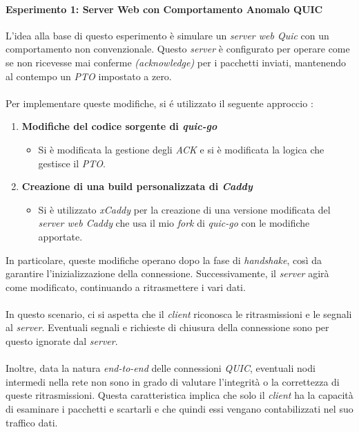 \paragraph{Esperimento 1: Server Web con Comportamento Anomalo QUIC}
\noindent L'idea alla base di questo esperimento è simulare un \emph{server web Quic} con un comportamento non convenzionale. 
Questo \emph{server} è configurato per operare come se non ricevesse mai conferme \emph{(acknowledge)} per i pacchetti inviati, mantenendo al contempo un \emph{PTO} impostato a zero.
\\\\
Per implementare queste modifiche, si é utilizzato il seguente approccio : 
\begin{enumerate}[label=\roman*]
    \item \textbf{Modifiche del codice sorgente di \emph{quic-go}}
    \begin{itemize}
        \item Si è modificata la gestione degli \emph{ACK} e si è modificata la logica che gestisce il \emph{PTO}.
    \end{itemize}
    \item \textbf{Creazione di una build personalizzata di \emph{Caddy}}
    \begin{itemize}
        \item Si è utilizzato \emph{xCaddy} per la creazione di una versione modificata del \emph{server web Caddy} che usa il mio \emph{fork} di \emph{quic-go} con le modifiche apportate.
    \end{itemize}
\end{enumerate}
In particolare, queste modifiche operano dopo la fase di \emph{handshake}, così da garantire l'inizializzazione della connessione. Successivamente, il \emph{server} agirà come modificato, continuando a ritrasmettere i vari dati.
\\\\
In questo scenario, ci si aspetta che il \emph{client} riconosca le ritrasmissioni e le segnali al \emph{server}. Eventuali segnali e richieste di chiusura della connessione sono per questo ignorate dal \emph{server}.
\\\\
Inoltre, data la natura \emph{end-to-end} delle connessioni \emph{QUIC}, eventuali nodi intermedi nella rete non sono in grado di valutare l'integrità o la correttezza di queste ritrasmissioni. Questa caratteristica implica che solo il \emph{client} ha la capacità di esaminare i pacchetti e scartarli e che quindi essi vengano contabilizzati nel suo traffico dati.
